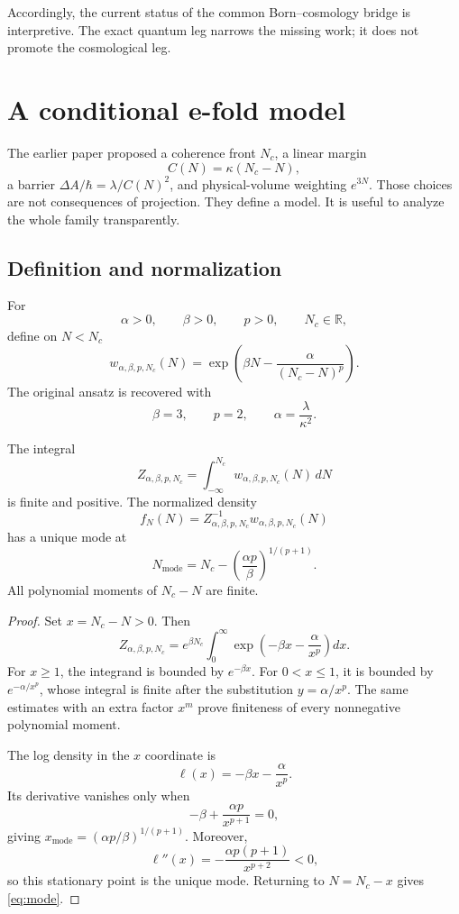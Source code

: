 \documentclass[11pt]{article}
\begin{document}
Accordingly, the current status of the common Born--cosmology bridge is
interpretive. The exact quantum leg narrows the missing work; it does not
promote the cosmological leg.

\section{A conditional e-fold model}

The earlier paper proposed a coherence front \(N_c\), a linear margin
\[
C(N)=\kappa(N_c-N),
\]
a barrier \(\Delta A/\hbar=\lambda/C(N)^2\), and physical-volume weighting
\(e^{3N}\). Those choices are not consequences of projection. They define a
model. It is useful to analyze the whole family transparently.

\subsection{Definition and normalization}

For
\[
\alpha>0,\qquad \beta>0,\qquad p>0,\qquad N_c\in\mathbb{R},
\]
define on \(N<N_c\)
\begin{equation}
w_{\alpha,\beta,p,N_c}(N)
=
\exp\left(
\beta N-\frac{\alpha}{(N_c-N)^p}
\right).
\label{eq:weight}
\end{equation}
The original ansatz is recovered with
\[
\beta=3,\qquad p=2,\qquad
\alpha=\frac{\lambda}{\kappa^2}.
\]

\begin{theorem}
The integral
\[
Z_{\alpha,\beta,p,N_c}
=\int_{-\infty}^{N_c}
w_{\alpha,\beta,p,N_c}(N)\,dN
\]
is finite and positive. The normalized density
\[
f_N(N)=Z_{\alpha,\beta,p,N_c}^{-1}
w_{\alpha,\beta,p,N_c}(N)
\]
has a unique mode at
\begin{equation}
N_{\mathrm{mode}}
=N_c-\left(\frac{\alpha p}{\beta}\right)^{1/(p+1)}.
\label{eq:mode}
\end{equation}
All polynomial moments of \(N_c-N\) are finite.
\end{theorem}

\begin{proof}
Set \(x=N_c-N>0\). Then
\[
Z_{\alpha,\beta,p,N_c}
=e^{\beta N_c}
\int_0^\infty
\exp\left(-\beta x-\frac{\alpha}{x^p}\right)dx.
\]
For \(x\geq1\), the integrand is bounded by \(e^{-\beta x}\).
For \(0<x\leq1\), it is bounded by \(e^{-\alpha/x^p}\), whose integral is
finite after the substitution \(y=\alpha/x^p\). The same estimates with an
extra factor \(x^m\) prove finiteness of every nonnegative polynomial moment.

The log density in the \(x\) coordinate is
\[
\ell(x)=-\beta x-\frac{\alpha}{x^p}.
\]
Its derivative vanishes only when
\[
-\beta+\frac{\alpha p}{x^{p+1}}=0,
\]
giving \(x_{\mathrm{mode}}=(\alpha p/\beta)^{1/(p+1)}\). Moreover,
\[
\ell''(x)
=-\frac{\alpha p(p+1)}{x^{p+2}}<0,
\]
so this stationary point is the unique mode. Returning to \(N=N_c-x\)
gives \eqref{eq:mode}.
\end{proof}
\end{document}

